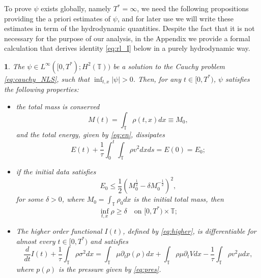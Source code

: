 \documentclass[leqno]{amsart}
\theoremstyle{plain}
\theoremstyle{definition}
\theoremstyle{remark}
\newtheorem{rem}[thm]{\protect\remarkname}
\theoremstyle{plain}
\theoremstyle{plain}
\newtheorem{prop}[thm]{\protect\propositionname}
\providecommand{\propositionname}{Proposition}
\providecommand{\remarkname}{Remark}
\def\T{{\mathbb T}}%
\def\d{{\partial}}
\numberwithin{equation}{section}
\begin{document}
To prove $\psi$ exists globally, namely $T^*=\infty$, we need the following propositions providing the a priori estimates of $\psi$, and for later use we will write these estimates in term of the hydrodynamic quantities. Despite the fact that it is not necessary for the purpose of our analysis, in the Appendix we provide a formal calculation that derives identity \eqref{eq:rl_I} below in a purely hydrodynamic way.

\begin{prop}\label{prop:3.2}
The $\psi\in L^\infty([0,T^*);H^2(\T))$ be a solution to the Cauchy problem \eqref{eq:cauchy_NLS}, such that $\inf_{t,x}|\psi|>0$. Then, for any $t\in[0,T^*)$, $\psi$ satisfies the following properties:
\begin{itemize}
\item[(1)] the total mass is conserved
\begin{equation}\label{eq:cons_mass}
M(t)=\int_\T\rho(t,x) dx\equiv M_0,
\end{equation}
and the total energy, given by \eqref{eq:en}, dissipates 
\begin{equation}\label{eq:en_disp}
E(t)+\frac{1}{\tau}\int_0^t\int_\T \rho v^2 dxds=E(0)=E_0;
\end{equation}
\item[(2)] if the initial data satisfies
\begin{equation}\label{eq:encr}
E_0\leq \frac12(M_0^\frac12-\delta M_0^{-\frac12})^2,
\end{equation}
for some $\delta>0$, where $M_0=\int_\T\rho_0 dx$ is the initial total mass, then 
\[
\inf_{t,x}\rho\geq \delta\quad \textrm{on }[0,T^*)\times\T;
\]

\item[(3)] The higher order functional $I(t)$, defined by \eqref{eq:higher}, is differentiable for almost every $t\in [0,T^*)$ and satisfies
\begin{equation}\label{eq:rl_I}
\frac{d}{dt} I(t)+\frac{1}{\tau}\int_\T\rho \sigma^2 dx=\int_\T \mu\d_tp(\rho)dx+\int_\T\rho\mu \d_tVdx-\frac{1}{\tau}\int_\T\rho v^2\mu dx,
\end{equation}
where $p(\rho)$ is the pressure given by \eqref{eq:pres}.
\end{itemize}
\end{prop}
\end{document}
